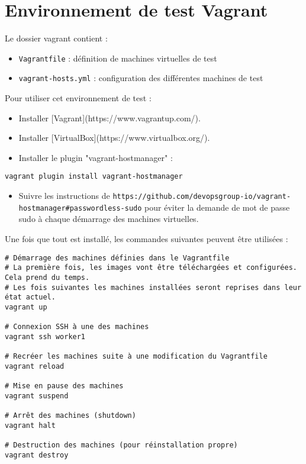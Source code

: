 \documentclass[a4paper,oneside,11pt]{article}
\begin{document}
\section{Environnement de test Vagrant}

Le dossier vagrant contient :
\begin{itemize}
	\item  \verb!Vagrantfile! : définition de machines virtuelles de test
	\item  \verb!vagrant-hosts.yml! : configuration des différentes machines de test
\end{itemize}

Pour utiliser cet environnement de test :

\begin{itemize}
\item Installer [Vagrant](https://www.vagrantup.com/).
\item Installer [VirtualBox](https://www.virtualbox.org/).
\item Installer le plugin "vagrant-hostmanager" :
\end{itemize}

\begin{verbatim}
vagrant plugin install vagrant-hostmanager
\end{verbatim}

\begin{itemize}
\item Suivre les instructions de \texttt{https://github.com/devopsgroup-io/vagrant-hostmanager\#passwordless-sudo} pour éviter la demande de mot de passe sudo à chaque démarrage des machines virtuelles.
\end{itemize}
Une fois que tout est installé, les commandes suivantes peuvent être utilisées :

\begin{verbatim}
# Démarrage des machines définies dans le Vagrantfile
# La première fois, les images vont être téléchargées et configurées. Cela prend du temps.
# Les fois suivantes les machines installées seront reprises dans leur état actuel.
vagrant up

# Connexion SSH à une des machines
vagrant ssh worker1

# Recréer les machines suite à une modification du Vagrantfile
vagrant reload

# Mise en pause des machines
vagrant suspend

# Arrêt des machines (shutdown)
vagrant halt

# Destruction des machines (pour réinstallation propre)
vagrant destroy
\end{verbatim}
\end{document}
